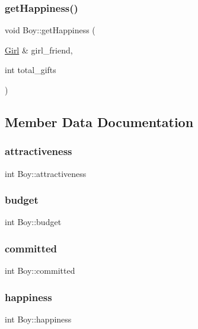 \subsubsection{\texorpdfstring{get\+Happiness()}{getHappiness()}}
{\footnotesize\ttfamily void Boy\+::get\+Happiness (\begin{DoxyParamCaption}\item[{\hyperlink{class_girl}{Girl} \&}]{girl\+\_\+friend,  }\item[{int}]{total\+\_\+gifts }\end{DoxyParamCaption})}



\subsection{Member Data Documentation}
\mbox{\label{class_boy_a679e59279116986aaae135d8a524bc46}} 
\subsubsection{\texorpdfstring{attractiveness}{attractiveness}}
{\footnotesize\ttfamily int Boy\+::attractiveness}

\mbox{\label{class_boy_a3b755250e77f892967872c7eb4c26685}} 
\subsubsection{\texorpdfstring{budget}{budget}}
{\footnotesize\ttfamily int Boy\+::budget}

\mbox{\label{class_boy_ab92b452f9cf9d97fc0c0f8aa6139da46}} 
\subsubsection{\texorpdfstring{committed}{committed}}
{\footnotesize\ttfamily int Boy\+::committed}

\mbox{\label{class_boy_adaf15f15972678dbd77e8b8b319d5767}} 
\subsubsection{\texorpdfstring{happiness}{happiness}}
{\footnotesize\ttfamily int Boy\+::happiness}

